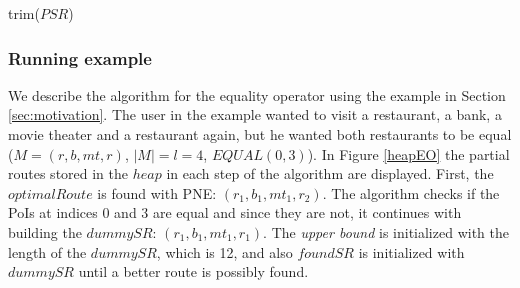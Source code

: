 \pagebreak

\begin{procedure}[H]
\caption{trim($PSR$)}
\label{proc:trim}
	
\end{procedure}

\subsubsection{Running example}
We describe the algorithm for the equality operator using the example in Section \ref{sec:motivation}. The user in the example wanted to visit a restaurant, a bank, a movie theater and a restaurant again, but he wanted both restaurants to be equal ($M = (r, b, mt, r)$, $|M| = l = 4$, $EQUAL(0, 3)$). In Figure \ref{heapEO} the partial routes stored in the $heap$ in each step of the algorithm are displayed.
First, the $optimalRoute$ is found with PNE: $(r_1, b_1, mt_1, r_2)$. The algorithm checks if the PoIs at indices 0 and 3 are equal and since they are not, it continues with building the $dummySR$: $(r_1, b_1, mt_1, r_1)$. The \textit{upper bound} is initialized with the length of the $dummySR$, which is 12, and also $foundSR$ is initialized with $dummySR$ until a better route is possibly found.
